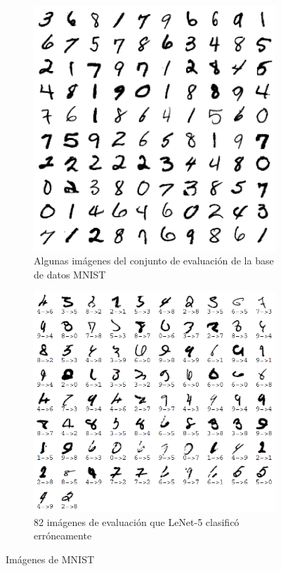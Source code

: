 \begin{figure}[h!]
    \centering
    \begin{subfigure}[b]{0.4\textwidth}
        \centering
        \includegraphics[width=\textwidth]{images/mnist/MNIST.png}
        \caption{Algunas imágenes del conjunto de evaluación de la base de datos MNIST \cite{Lecun98}}
        \label{mnist1}
    \end{subfigure}
    \hspace{1cm}
    \begin{subfigure}[b]{0.45\textwidth}
        \centering
        \includegraphics[width=\textwidth]{images/mnist/MNISTmiscl.png}
        \caption{82 imágenes de evaluación que LeNet-5 clasificó erróneamente \cite{Lecun98}}
        \label{mnist2}
    \end{subfigure}
    \caption{Imágenes de MNIST}
    \label{mnist}
\end{figure}

